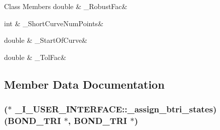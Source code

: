\begin{DoxyFields}{Class Members}
double\hypertarget{struct___i___u_s_e_r___i_n_t_e_r_f_a_c_e_a8761442826641e25927a725362a8308e}{}\label{struct___i___u_s_e_r___i_n_t_e_r_f_a_c_e_a8761442826641e25927a725362a8308e}
&
\+\_\+\+Robust\+Fac&
\\
\hline

int\hypertarget{struct___i___u_s_e_r___i_n_t_e_r_f_a_c_e_aa762277a694d88f830b70daa620e437a}{}\label{struct___i___u_s_e_r___i_n_t_e_r_f_a_c_e_aa762277a694d88f830b70daa620e437a}
&
\+\_\+\+Short\+Curve\+Num\+Points&
\\
\hline

double\hypertarget{struct___i___u_s_e_r___i_n_t_e_r_f_a_c_e_afe4faab09de89900091529efa7b5b868}{}\label{struct___i___u_s_e_r___i_n_t_e_r_f_a_c_e_afe4faab09de89900091529efa7b5b868}
&
\+\_\+\+Start\+Of\+Curve&
\\
\hline

double\hypertarget{struct___i___u_s_e_r___i_n_t_e_r_f_a_c_e_a88a6397b640fd0557454f1a63b28523c}{}\label{struct___i___u_s_e_r___i_n_t_e_r_f_a_c_e_a88a6397b640fd0557454f1a63b28523c}
&
\+\_\+\+Tol\+Fac&
\\
\hline

\end{DoxyFields}


\subsection{Member Data Documentation}
\subsubsection[{\texorpdfstring{\+\_\+assign\+\_\+btri\+\_\+states}{_assign_btri_states}}]{($\ast$ \+\_\+\+I\+\_\+\+U\+S\+E\+R\+\_\+\+I\+N\+T\+E\+R\+F\+A\+C\+E\+::\+\_\+assign\+\_\+btri\+\_\+states) ({\bf B\+O\+N\+D\+\_\+\+T\+RI} $\ast$, {\bf B\+O\+N\+D\+\_\+\+T\+RI} $\ast$)}\hypertarget{struct___i___u_s_e_r___i_n_t_e_r_f_a_c_e_a43a48fae1f461c85c6e7a78aee38b3b8}{}\label{struct___i___u_s_e_r___i_n_t_e_r_f_a_c_e_a43a48fae1f461c85c6e7a78aee38b3b8}
